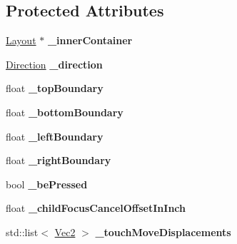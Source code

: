 \subsection*{Protected Attributes}
\begin{DoxyCompactItemize}
\item 
\mbox{\label{classui_1_1ScrollView_a7d6fd7a66d6dbbaa60bb1d3461f93523}} 
\hyperlink{classui_1_1Layout}{Layout} $\ast$ {\bfseries \+\_\+inner\+Container}
\item 
\mbox{\label{classui_1_1ScrollView_a23fc2df134b5ea936731f86d4dab4e0c}} 
\hyperlink{classui_1_1ScrollView_aed2d778ae8098dcafe323b2beae8dd6b}{Direction} {\bfseries \+\_\+direction}
\item 
\mbox{\label{classui_1_1ScrollView_a2db9685d66f227b0fb19d9ffc59a2803}} 
float {\bfseries \+\_\+top\+Boundary}
\item 
\mbox{\label{classui_1_1ScrollView_a96e8deba983857e4679fad368320d100}} 
float {\bfseries \+\_\+bottom\+Boundary}
\item 
\mbox{\label{classui_1_1ScrollView_a91dd44ab09f84f5923622514a311fa27}} 
float {\bfseries \+\_\+left\+Boundary}
\item 
\mbox{\label{classui_1_1ScrollView_a0502b6976d4445c2daa86914f13690da}} 
float {\bfseries \+\_\+right\+Boundary}
\item 
\mbox{\label{classui_1_1ScrollView_a21206f448fd1e256d7d998d351b9a926}} 
bool {\bfseries \+\_\+be\+Pressed}
\item 
\mbox{\label{classui_1_1ScrollView_a9e8cbaa351f6a1fd45244f92eba553fb}} 
float {\bfseries \+\_\+child\+Focus\+Cancel\+Offset\+In\+Inch}
\item 
\mbox{\label{classui_1_1ScrollView_ae8024b22ab8300b2daa10322f92b0561}} 
std\+::list$<$ \hyperlink{classVec2}{Vec2} $>$ {\bfseries \+\_\+touch\+Move\+Displacements}
\item 
\mbox{\label{classui_1_1ScrollView_a39f0465964c9d729321f4cbb2944bb6b}} 

\end{DoxyCompactItemize}
